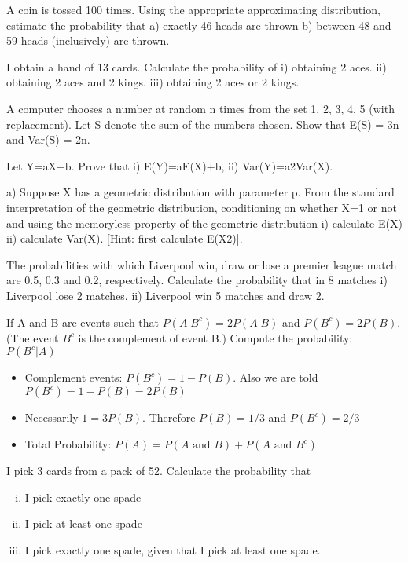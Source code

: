 
\item A coin is tossed 100 times. Using the appropriate approximating distribution, estimate the probability that
	a) exactly 46 heads are thrown
	b) between 48 and 59 heads (inclusively) are thrown.
\item	I obtain a hand of 13 cards. Calculate the probability of
	i) obtaining 2 aces.
	ii) obtaining 2 aces and 2 kings.
	iii) obtaining 2 aces or 2 kings.
	
\item A computer chooses a number at random n times from the set {1, 2, 3, 4, 5} (with replacement). Let S denote the sum of the numbers chosen. Show that
	E(S) = 3n and Var(S) = 2n.
	
\item	Let Y=aX+b. Prove that i) E(Y)=aE(X)+b, ii) Var(Y)=a2Var(X).
	
\item	a) Suppose X has a geometric distribution with parameter p. From the standard interpretation of the geometric distribution, conditioning on whether X=1 or not and using the memoryless property of the geometric distribution
	i)	calculate E(X)
	ii)	calculate Var(X). [Hint: first calculate E(X2)].
	
\item	The probabilities with which Liverpool win, draw or lose a premier league match are 0.5, 0.3 and 0.2, respectively. Calculate the probability that in 8 matches
	i)	Liverpool lose 2 matches.
	ii)	Liverpool win 5 matches and draw 2.
\item %
If A and B are events such that $P(A|B^c) = 2P(A|B)$ and $P(B^c) = 2P(B)$.
(The event $B^c$ is the complement of event B.) Compute the probability: $P(B^c|A)$ 
\begin{framed}
\begin{itemize}
\item Complement events: $P(B^c) = 1 - P(B)$. Also we are told $P(B^c) = 1-P(B)= 2P(B)$
\item Necessarily $1 = 3P(B)$. Therefore $P(B) = 1/3$ and  $P(B^c)=2/3$
\item Total Probability: $P(A) = P(A \mbox{ and } B) + P(A \mbox{ and } B^c)$
\end{itemize}
\end{framed}

\item I pick 3 cards from a pack of 52. Calculate the probability that 
\begin{enumerate}[(i)]
\item I pick exactly one spade
\item I pick at least one spade
\item I pick exactly one spade, given that I pick at least one spade.
\end{enumerate}

